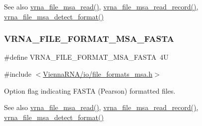 \begin{DoxySeeAlso}{See also}
\mbox{\hyperlink{group__file__formats__msa_gad02d5d12bda54611c915a1019323b7be}{vrna\+\_\+file\+\_\+msa\+\_\+read()}}, \mbox{\hyperlink{group__file__formats__msa_gad4203a438622b2df7bc2f16578d54799}{vrna\+\_\+file\+\_\+msa\+\_\+read\+\_\+record()}}, \mbox{\hyperlink{group__file__formats__msa_gade4fa8136ebb2d0f7eb3f8b59a8658e3}{vrna\+\_\+file\+\_\+msa\+\_\+detect\+\_\+format()}} 
\end{DoxySeeAlso}
\mbox{\label{group__file__formats__msa_gacf6274a2c825f34e4131404665b00604}} 
\subsubsection{\texorpdfstring{VRNA\_FILE\_FORMAT\_MSA\_FASTA}{VRNA\_FILE\_FORMAT\_MSA\_FASTA}}
{\footnotesize\ttfamily \#define V\+R\+N\+A\+\_\+\+F\+I\+L\+E\+\_\+\+F\+O\+R\+M\+A\+T\+\_\+\+M\+S\+A\+\_\+\+F\+A\+S\+TA~4U}



{\ttfamily \#include $<$\mbox{\hyperlink{io_2file__formats__msa_8h}{Vienna\+R\+N\+A/io/file\+\_\+formats\+\_\+msa.\+h}}$>$}



Option flag indicating F\+A\+S\+TA (Pearson) formatted files. 

\begin{DoxySeeAlso}{See also}
\mbox{\hyperlink{group__file__formats__msa_gad02d5d12bda54611c915a1019323b7be}{vrna\+\_\+file\+\_\+msa\+\_\+read()}}, \mbox{\hyperlink{group__file__formats__msa_gad4203a438622b2df7bc2f16578d54799}{vrna\+\_\+file\+\_\+msa\+\_\+read\+\_\+record()}}, \mbox{\hyperlink{group__file__formats__msa_gade4fa8136ebb2d0f7eb3f8b59a8658e3}{vrna\+\_\+file\+\_\+msa\+\_\+detect\+\_\+format()}} 
\end{DoxySeeAlso}
\mbox{\label{group__file__formats__msa_gab3186d774c01570d2a47d0308eec4927}} 
